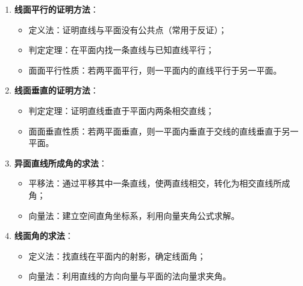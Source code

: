 \documentclass[11pt]{ctexrep}
\begin{document}
\begin{enumerate}
    \item \textbf{线面平行的证明方法}：
    \begin{itemize}
        \item 定义法：证明直线与平面没有公共点（常用于反证）；
        \item 判定定理：在平面内找一条直线与已知直线平行；
        \item 面面平行性质：若两平面平行，则一平面内的直线平行于另一平面。
    \end{itemize}
    
    \item \textbf{线面垂直的证明方法}：
    \begin{itemize}
        \item 判定定理：证明直线垂直于平面内两条相交直线；
        \item 面面垂直性质：若两平面垂直，则一平面内垂直于交线的直线垂直于另一平面。
    \end{itemize}
    
    \item \textbf{异面直线所成角的求法}：
    \begin{itemize}
        \item 平移法：通过平移其中一条直线，使两直线相交，转化为相交直线所成角；
        \item 向量法：建立空间直角坐标系，利用向量夹角公式求解。
    \end{itemize}
    
    \item \textbf{线面角的求法}：
    \begin{itemize}
        \item 定义法：找直线在平面内的射影，确定线面角；
        \item 向量法：利用直线的方向向量与平面的法向量求夹角。
    \end{itemize}
\end{enumerate}
\end{document}
